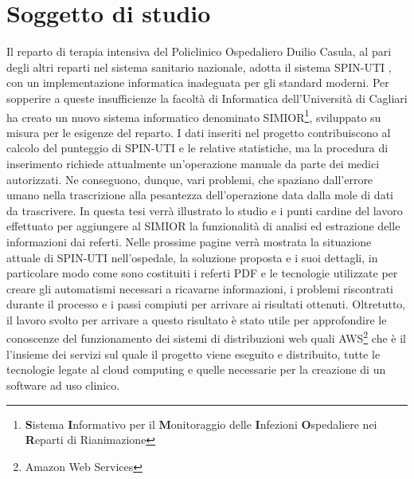 \section{Soggetto di studio}
Il reparto di terapia intensiva del Policlinico Ospedaliero Duilio Casula, al pari degli altri reparti nel sistema sanitario nazionale, adotta il sistema SPIN-UTI , con un 
implementazione informatica inadeguata per gli standard moderni. Per sopperire a queste insufficienze la facoltà di Informatica dell'Università di Cagliari ha creato un nuovo sistema informatico denominato SIMIOR\footnote{\textbf{S}istema \textbf{I}nformativo per il \textbf{M}onitoraggio delle \textbf{I}nfezioni \textbf{O}spedaliere nei \textbf{R}eparti di Rianimazione}, sviluppato su misura per le esigenze del reparto. I dati inseriti nel progetto contribuiscono al calcolo del punteggio di SPIN-UTI e le relative statistiche, ma la procedura di inserimento richiede attualmente un'operazione manuale da parte dei medici autorizzati. Ne conseguono, dunque, vari problemi, che spaziano dall'errore umano nella trascrizione alla pesantezza dell'operazione data dalla mole di dati da trascrivere.
In questa tesi verrà illustrato lo studio e i punti cardine del lavoro effettuato per aggiungere al SIMIOR la funzionalità di analisi ed estrazione delle informazioni dai referti. Nelle prossime pagine verrà mostrata la situazione attuale di SPIN-UTI nell'ospedale, la soluzione proposta e i suoi dettagli, in particolare modo come sono costituiti i referti PDF e le tecnologie utilizzate per creare gli automatismi necessari a ricavarne informazioni, i problemi riscontrati durante il processo e i passi compiuti per arrivare ai risultati ottenuti.
Oltretutto, il lavoro svolto per arrivare a questo risultato è stato utile per approfondire le conoscenze del funzionamento dei sistemi di distribuzioni web quali AWS\footnote{Amazon Web Services} che è il l'insieme dei servizi sul quale il progetto viene eseguito e distribuito, tutte le tecnologie legate al cloud computing e quelle necessarie per la creazione di un software ad uso clinico. 


